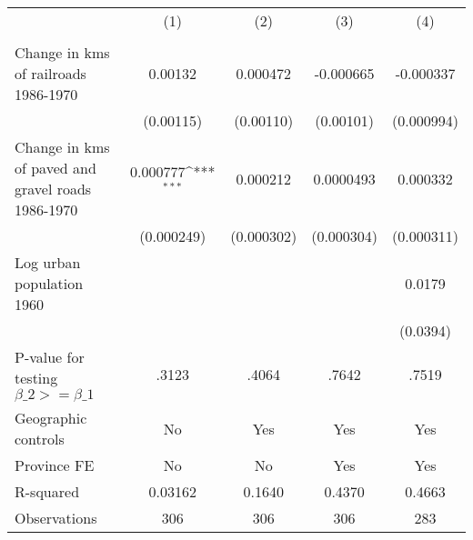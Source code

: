 {
\def\sym#1{\ifmmode^{#1}\else\(^{#1}\)\fi}
\begin{tabular}{l*{4}{c}}
\hline\hline
                &\multicolumn{1}{c}{(1)}&\multicolumn{1}{c}{(2)}&\multicolumn{1}{c}{(3)}&\multicolumn{1}{c}{(4)}\\
                &\multicolumn{1}{c}{}&\multicolumn{1}{c}{}&\multicolumn{1}{c}{}&\multicolumn{1}{c}{}\\
\hline
Change in kms of railroads 1986-1970&  0.00132         & 0.000472         &-0.000665         &-0.000337         \\
                &(0.00115)         &(0.00110)         &(0.00101)         &(0.000994)         \\
[1em]
Change in kms of paved and gravel roads 1986-1970& 0.000777\sym{***}& 0.000212         &0.0000493         & 0.000332         \\
                &(0.000249)         &(0.000302)         &(0.000304)         &(0.000311)         \\
[1em]
Log urban population 1960&                  &                  &                  &   0.0179         \\
                &                  &                  &                  & (0.0394)         \\
\hline
P-value for testing $\beta\_{2} >= \beta\_{1}$&    .3123         &    .4064         &    .7642         &    .7519         \\
Geographic controls&       No         &      Yes         &      Yes         &      Yes         \\
Province FE     &       No         &       No         &      Yes         &      Yes         \\
R-squared       &  0.03162         &   0.1640         &   0.4370         &   0.4663         \\
Observations    &      306         &      306         &      306         &      283         \\
\hline\hline
\end{tabular}
}
